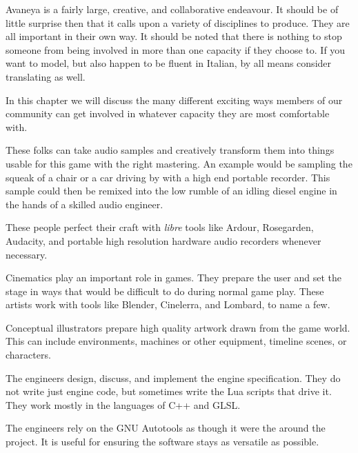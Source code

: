 
Avaneya is a fairly large, creative, and collaborative endeavour. It should be of little surprise then that it calls upon a variety of disciplines to produce. They are all important in their own way. It should be noted that there is nothing to stop someone from being involved in more than one capacity if they choose to. If you want to model, but also happen to be fluent in Italian, by all means consider translating as well.

In this chapter we will discuss the many different exciting ways members of our community can get involved in whatever capacity they are most comfortable with.


These folks can take audio samples and creatively transform them into things usable for this game with the right mastering. An example would be sampling the squeak of a chair or a car driving by with a high end portable recorder. This sample could then be remixed into the low rumble of an idling diesel engine in the hands of a skilled audio engineer. 

These people perfect their craft with {\it libre} tools like Ardour, Rosegarden, Audacity, and portable high resolution hardware audio recorders whenever necessary.


Cinematics play an important role in games. They prepare the user and set the stage in ways that would be difficult to do during normal game play. These artists work with tools like Blender, Cinelerra, and Lombard, to name a few.


Conceptual illustrators prepare high quality artwork drawn from the game world. This can include environments, machines or other equipment, timeline scenes, or characters.


The engineers design, discuss, and implement the engine specification. They do not write just engine code, but sometimes write the Lua scripts that drive it. They work mostly in the languages of C++ and GLSL. 

The engineers rely on the GNU Autotools as though it were the  around the project. It is useful for ensuring the software stays as versatile as possible. 

